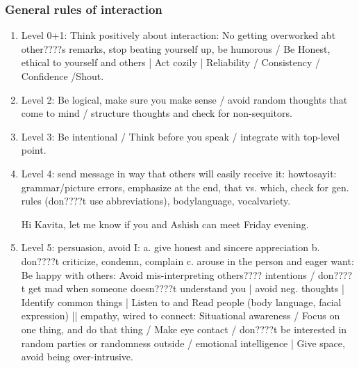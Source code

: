 \begin{frame}[label=rulesofInt]
\frametitle{General rules of interaction} 
\begin{enumerate} 
\tiny \item \tiny Level 0+1: Think positively about interaction: No getting overworked
abt other????s remarks, stop beating yourself up, be humorous / Be
Honest, ethical to yourself and others | Act cozily | Reliability /
Consistency / Confidence /Shout. 
\item \tiny Level 2: Be logical, make sure you make sense / avoid random
thoughts that come to mind / structure thoughts and check for
non-sequitors.
\item \tiny Level 3: Be intentional / Think before you speak / integrate with
top-level point.
\item \tiny Level 4: send message in way that others will easily receive it:
howtosayit: grammar/picture errors, emphasize at the end, that
vs. which, check for gen. rules (don????t use abbreviations),
bodylanguage, vocalvariety.

Hi Kavita, let me know if you and Ashish can meet Friday evening. 

\item \tiny Level 5: persuasion, avoid I: a. give honest and sincere
appreciation b. don????t criticize, condemn, complain c. arouse in the
person and eager want: Be happy with others: Avoid mis-interpreting
others???? intentions / don????t get mad when someone doesn????t understand you
| avoid neg. thoughts | Identify common things | Listen to and Read
people (body language, facial expression) || empathy, wired to
connect: Situational awareness / Focus on one thing, and do that thing
/ Make eye contact / don????t be interested in random parties or
randomness outside / emotional intelligence | Give space, avoid being
over-intrusive.
\end{enumerate} 
\end{frame} 

